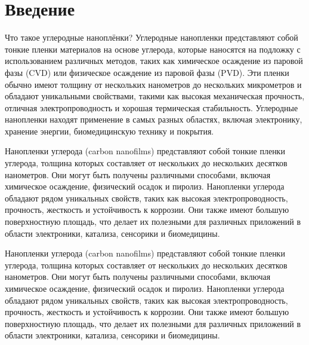\documentclass[14pt]{extarticle}
\begin{document}
\tableofcontents





\section{Введение}

Что такое углеродные наноплёнки?
Углеродные нанопленки представляют собой тонкие пленки материалов на основе углерода, которые наносятся на подложку с использованием различных методов, таких как химическое осаждение из паровой фазы (CVD) или физическое осаждение из паровой фазы (PVD). Эти пленки обычно имеют толщину от нескольких нанометров до нескольких микрометров и обладают уникальными свойствами, такими как высокая механическая прочность, отличная электропроводность и хорошая термическая стабильность. Углеродные нанопленки находят применение в самых разных областях, включая электронику, хранение энергии, биомедицинскую технику и покрытия.





Нанопленки углерода (carbon nanofilms) представляют собой тонкие пленки углерода, толщина которых составляет от нескольких до нескольких десятков нанометров. Они могут быть получены различными способами, включая химическое осаждение, физический осадок и пиролиз.
Нанопленки углерода обладают рядом уникальных свойств, таких как высокая электропроводность, прочность, жесткость и устойчивость к коррозии. Они также имеют большую поверхностную площадь, что делает их полезными для различных приложений в области электроники, катализа, сенсорики и биомедицины.


Нанопленки углерода (carbon nanofilms) представляют собой тонкие пленки углерода, толщина которых составляет от нескольких до нескольких десятков нанометров. Они могут быть получены различными способами, включая химическое осаждение, физический осадок и пиролиз.
Нанопленки углерода обладают рядом уникальных свойств, таких как высокая электропроводность, прочность, жесткость и устойчивость к коррозии. Они также имеют большую поверхностную площадь, что делает их полезными для различных приложений в области электроники, катализа, сенсорики и биомедицины.
\end{document}
